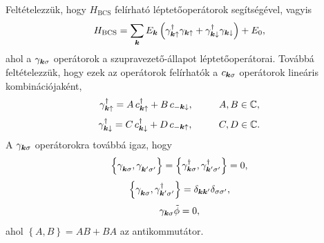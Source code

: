 \documentclass[a4paper,12pt,titlepage]{article}
\newcommand{\KK}{{\vb*{k}}}
\newcommand{\phantomdagger}{{\phantom{\dagger}}}
\begin{document}
Feltételezzük, hogy $H_\text{BCS}$ felírható léptetőoperátorok segítségével, vagyis
\begin{equation} \label{H-BCS}
	H_\text{BCS} = \sum\limits_\KK E_\KK \left( \gamma_{\KK \uparrow}^\dagger \gamma_{\KK \uparrow} + \gamma_{\KK \downarrow}^\dagger \gamma_{\KK \downarrow} \right) + E_0,
\end{equation}
ahol a $\gamma_{\KK \sigma}$ operátorok a szupravezető-állapot léptetőoperátorai.  Továbbá feltételezzük, hogy ezek az operátorok felírhatók a $c_{\KK \sigma}$ operátorok lineáris kombinációjaként,
\begin{equation} \label{gamma-from-c}
	\gamma_{\KK \uparrow}^\dagger = A \, c_{\KK \uparrow}^\dagger + B \, c_{-\KK \downarrow}, ~~~~~~~~ A, B \in \mathbb{C},
\end{equation}
\begin{equation}
	\gamma_{\KK \downarrow}^\dagger = C \, c_{\KK \downarrow}^\dagger + D \, c_{-\KK \uparrow}, ~~~~~~~~ C, D \in \mathbb{C}.
\end{equation}
A $\gamma_{\KK \sigma}$ operátorokra továbbá igaz, hogy
\begin{equation} \label{gamma-anticommutator-zero}
	\left\{ \gamma_{\KK \sigma}^\phantomdagger, \gamma_{\KK^\prime \sigma^\prime}^\phantomdagger \right\} = \left\{ \gamma_{\KK \sigma}^\dagger, \gamma_{\KK^\prime \sigma^\prime}^\dagger \right\} = 0,
\end{equation}
\begin{equation} \label{gamma-anticommutator}
	\left\{ \gamma_{\KK \sigma}^\phantomdagger, \gamma_{\KK^\prime \sigma^\prime}^\dagger \right\} = \delta_{\KK \KK^\prime} \delta_{\sigma \sigma^\prime},
\end{equation}
\begin{equation} \label{gamma-zero}
	\gamma_{\KK \sigma} \tilde{\phi} = 0,
\end{equation}
ahol $\left\{ A, B \right\} = A B + B A$ az antikommutátor.
\end{document}
